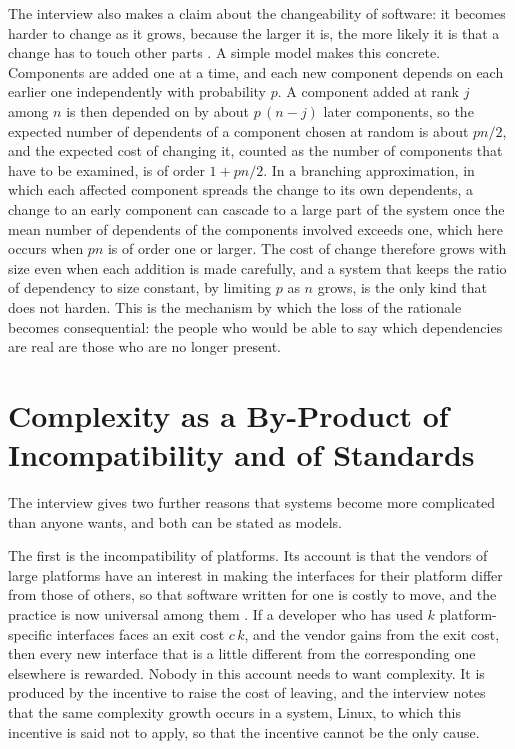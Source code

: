 \documentclass[11pt,openany]{book}
\theoremstyle{definition}
\theoremstyle{remark}
\begin{document}
The interview also makes a claim about the changeability of software: it becomes harder to change as it grows, because the larger it is, the more likely it is that a change has to touch other parts \cite{blow2026}. A simple model makes this concrete. Components are added one at a time, and each new component depends on each earlier one independently with probability $p$. A component added at rank $j$ among $n$ is then depended on by about $p\,(n-j)$ later components, so the expected number of dependents of a component chosen at random is about $pn/2$, and the expected cost of changing it, counted as the number of components that have to be examined, is of order $1+pn/2$. In a branching approximation, in which each affected component spreads the change to its own dependents, a change to an early component can cascade to a large part of the system once the mean number of dependents of the components involved exceeds one, which here occurs when $pn$ is of order one or larger. The cost of change therefore grows with size even when each addition is made carefully, and a system that keeps the ratio of dependency to size constant, by limiting $p$ as $n$ grows, is the only kind that does not harden. This is the mechanism by which the loss of the rationale becomes consequential: the people who would be able to say which dependencies are real are those who are no longer present.

\section{Complexity as a By-Product of Incompatibility and of Standards}

The interview gives two further reasons that systems become more complicated than anyone wants, and both can be stated as models.

The first is the incompatibility of platforms. Its account is that the vendors of large platforms have an interest in making the interfaces for their platform differ from those of others, so that software written for one is costly to move, and the practice is now universal among them \cite{blow2026}. If a developer who has used $k$ platform-specific interfaces faces an exit cost $c\,k$, and the vendor gains from the exit cost, then every new interface that is a little different from the corresponding one elsewhere is rewarded. Nobody in this account needs to want complexity. It is produced by the incentive to raise the cost of leaving, and the interview notes that the same complexity growth occurs in a system, Linux, to which this incentive is said not to apply, so that the incentive cannot be the only cause.
\end{document}
